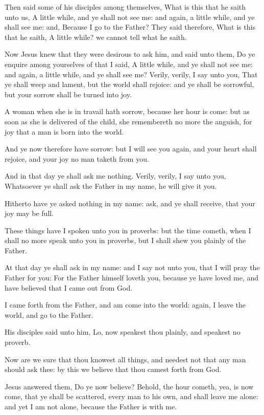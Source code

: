\verse Then said some of his disciples among themselves, What is this that he saith unto us, A little while, and ye shall not see me: and again, a little while, and ye shall see me: and, Because I go to the Father?  \verse They said therefore, What is this that he saith, A little while? we cannot tell what he saith.

\verse Now Jesus knew that they were desirous to ask him, and said unto them, Do ye enquire among yourselves of that I said, A little while, and ye shall not see me: and again, a little while, and ye shall see me?  \verse Verily, verily, I say unto you, That ye shall weep and lament, but the world shall rejoice: and ye shall be sorrowful, but your sorrow shall be turned into joy.

\verse A woman when she is in travail hath sorrow, because her hour is come: but as soon as she is delivered of the child, she remembereth no more the anguish, for joy that a man is born into the world.

\verse And ye now therefore have sorrow: but I will see you again, and your heart shall rejoice, and your joy no man taketh from you.

\verse And in that day ye shall ask me nothing. Verily, verily, I say unto you, Whatsoever ye shall ask the Father in my name, he will give it you.

\verse Hitherto have ye asked nothing in my name: ask, and ye shall receive, that your joy may be full.

\verse These things have I spoken unto you in proverbs: but the time cometh, when I shall no more speak unto you in proverbs, but I shall shew you plainly of the Father.

\verse At that day ye shall ask in my name: and I say not unto you, that I will pray the Father for you: \verse For the Father himself loveth you, because ye have loved me, and have believed that I came out from God.

\verse I came forth from the Father, and am come into the world: again, I leave the world, and go to the Father.

\verse His disciples said unto him, Lo, now speakest thou plainly, and speakest no proverb.

\verse Now are we sure that thou knowest all things, and needest not that any man should ask thee: by this we believe that thou camest forth from God.

\verse Jesus answered them, Do ye now believe?  \verse Behold, the hour cometh, yea, is now come, that ye shall be scattered, every man to his own, and shall leave me alone: and yet I am not alone, because the Father is with me.


